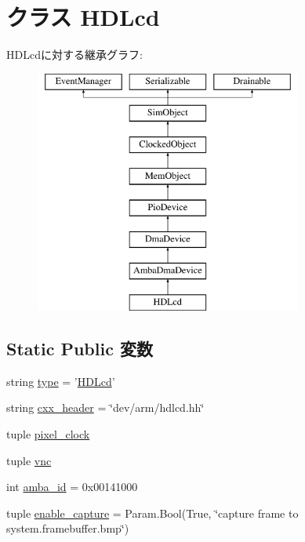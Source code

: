 \hypertarget{classRealView_1_1HDLcd}{
\section{クラス HDLcd}
\label{classRealView_1_1HDLcd}
}
HDLcdに対する継承グラフ:\begin{figure}[H]
\begin{center}
\leavevmode
\includegraphics[height=8cm]{classRealView_1_1HDLcd}
\end{center}
\end{figure}
\subsection*{Static Public 変数}
\begin{DoxyCompactItemize}
\item 
string \hyperlink{classRealView_1_1HDLcd_acce15679d830831b0bbe8ebc2a60b2ca}{type} = '\hyperlink{classRealView_1_1HDLcd}{HDLcd}'
\item 
string \hyperlink{classRealView_1_1HDLcd_a17da7064bc5c518791f0c891eff05fda}{cxx\_\-header} = \char`\"{}dev/arm/hdlcd.hh\char`\"{}
\item 
tuple \hyperlink{classRealView_1_1HDLcd_a1c05724bfa7560d233706f5367017198}{pixel\_\-clock}
\item 
tuple \hyperlink{classRealView_1_1HDLcd_afe937f4b2d4f6f3abce13db1d308617d}{vnc}
\item 
int \hyperlink{classRealView_1_1HDLcd_a38d7b9edfe6f0eea7a54e7e4f6253f3a}{amba\_\-id} = 0x00141000
\item 
tuple \hyperlink{classRealView_1_1HDLcd_ad54ef6219008e06976486cb101465f9d}{enable\_\-capture} = Param.Bool(True, \char`\"{}capture frame to system.framebuffer.bmp\char`\"{})
\end{DoxyCompactItemize}


